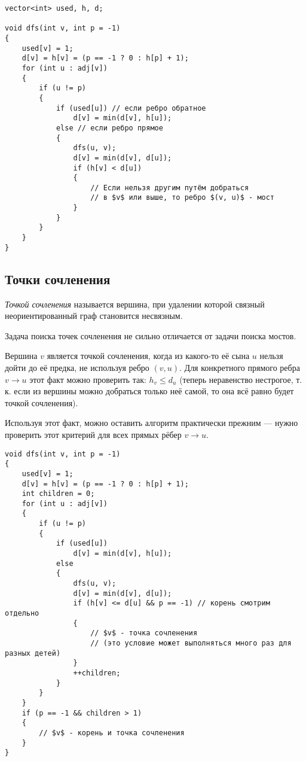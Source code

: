 \begin{verbatim}
vector<int> used, h, d;

void dfs(int v, int p = -1)
{
    used[v] = 1;
    d[v] = h[v] = (p == -1 ? 0 : h[p] + 1);
    for (int u : adj[v])
    {
        if (u != p)
        {
            if (used[u]) // если ребро обратное
                d[v] = min(d[v], h[u]);
            else // если ребро прямое
            {
                dfs(u, v);
                d[v] = min(d[v], d[u]);
                if (h[v] < d[u])
                {
                    // Если нельзя другим путём добраться
                    // в $v$ или выше, то ребро $(v, u)$ - мост
                }
            }
        }
    }
}
\end{verbatim}

\subsection{Точки сочленения}

\begin{definition}
    \textit{Точкой сочленения} называется вершина, при удалении которой связный неориентированный граф становится несвязным.
\end{definition}

Задача поиска точек сочленения не сильно отличается от задачи поиска мостов.

Вершина $v$ является точкой сочленения, когда из какого-то её сына $u$ нельзя дойти до её предка, не используя ребро $(v, u)$. Для конкретного прямого ребра $v \to u$ этот факт можно проверить так: $h_v \leqslant d_u$ (теперь неравенство нестрогое, т.\,к. если из вершины можно добраться только неё самой, то она всё равно будет точкой сочленения).

Используя этот факт, можно оставить алгоритм практически прежним --- нужно проверить этот критерий для всех прямых рёбер $v \to u$.

\begin{verbatim}
void dfs(int v, int p = -1)
{
    used[v] = 1;
    d[v] = h[v] = (p == -1 ? 0 : h[p] + 1);
    int children = 0;
    for (int u : adj[v])
    {
        if (u != p)
        {
            if (used[u])
                d[v] = min(d[v], h[u]);
            else
            {
                dfs(u, v);
                d[v] = min(d[v], d[u]);
                if (h[v] <= d[u] && p == -1) // корень смотрим отдельно
                {
                    // $v$ - точка сочленения
                    // (это условие может выполняться много раз для разных детей)
                }
                ++children;
            }
        }
    }
    if (p == -1 && children > 1)
    {
        // $v$ - корень и точка сочленения
    }
}
\end{verbatim}

